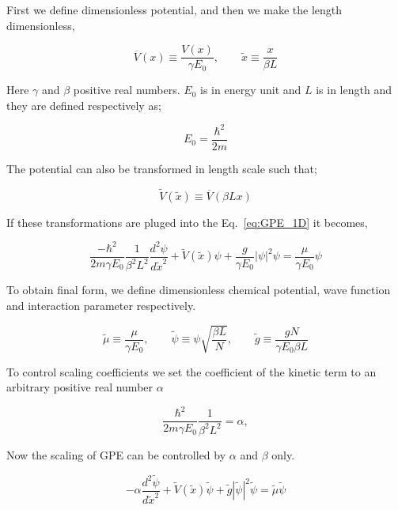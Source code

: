 \documentclass[a4paper,times,hidelinks,12pt]{article}
\begin{document}
First we define dimensionless potential, and then we make the length dimensionless,



$$ \overline{V}(x) \equiv \frac{V(x)}{\gamma E_0}, \qquad \widetilde{x} \equiv \frac{x}{\beta L} $$

\noindent Here $\gamma$ and $\beta$ positive real numbers. $E_0$ is in energy unit and $L$ is in length and they are defined respectively as;

$$E_0 = \frac{\hbar^2}{2m} $$

\noindent The potential can also be transformed in length scale such that; 

$$ \widetilde{V}(\widetilde{x}) \equiv \overline{V}(\beta L x) $$ 

\noindent If these transformations are pluged into the Eq.~\eqref{eq:GPE_1D} it becomes,

\begin{equation}
    \label{eq:GPE_1D_dimensionless_en_len}
    \frac{-\hbar^2}{2m\gamma E_0} \frac{1}{\beta^2 L^2}  \frac{d^2\psi}{d \widetilde{x}^2} + \widetilde{V}(\widetilde{x})\psi + \frac{g}{\gamma E_0}|\psi|^2\psi = \frac{\mu}{\gamma E_0}\psi
\end{equation}

\noindent To obtain final form, we define dimensionless chemical potential, wave function and interaction parameter respectively. 

$$\widetilde{\mu} \equiv \frac{\mu}{\gamma E_0}, \qquad \widetilde{\psi} \equiv \psi{\sqrt{\frac{\beta L}{N}}}, \qquad \widetilde{g} \equiv \frac{gN}{\gamma E_0 \beta L} $$

\noindent To control scaling coefficients we set the coefficient of the kinetic term to an arbitrary positive real number $\alpha$  

$$ \frac{\hbar^2}{2m\gamma E_0} \frac{1}{\beta^2 L^2} = \alpha  , $$

\noindent Now the scaling of GPE can be controlled by $\alpha$ and $\beta$ only.

\begin{equation}
\label{eq:GPE_dimensionless}
    -\alpha\frac{d^2\widetilde{\psi}}{d\widetilde{x}^2} + \widetilde{V}(\widetilde{x})\widetilde{\psi} + \widetilde{g}|\widetilde{\psi}|^2 \widetilde{\psi} = \widetilde{\mu} \widetilde{\psi}
\end{equation}
    
\end{document}
